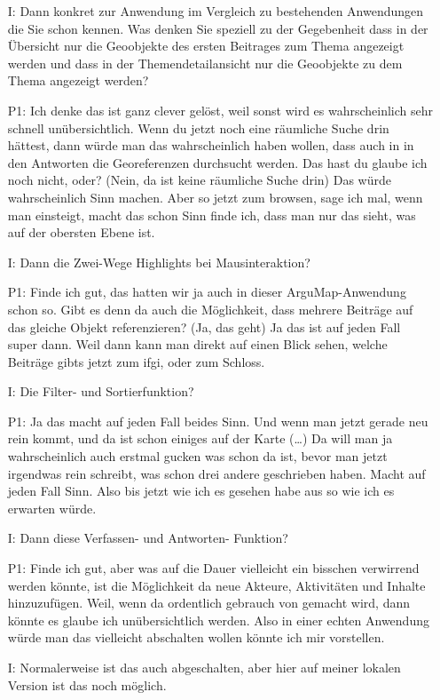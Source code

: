 \begin{itemize}
    \item[I:] Dann konkret zur Anwendung im Vergleich zu bestehenden Anwendungen die Sie schon kennen. Was denken Sie speziell zu der Gegebenheit dass in der {\"U}bersicht nur die Geoobjekte des ersten Beitrages zum Thema angezeigt werden und dass in der Themendetailansicht nur die Geoobjekte zu dem Thema angezeigt werden?
    \item[P1:] Ich denke das ist ganz clever gelöst, weil sonst wird es wahrscheinlich sehr schnell unübersichtlich. Wenn du jetzt noch eine räumliche Suche drin hättest, dann würde man das wahrscheinlich haben wollen, dass auch in in den Antworten die Georeferenzen durchsucht werden. Das hast du glaube ich noch nicht, oder? (Nein, da ist keine räumliche Suche drin) Das würde wahrscheinlich Sinn machen. Aber so jetzt zum browsen, sage ich mal, wenn man einsteigt, macht das schon Sinn finde ich, dass man nur das sieht, was auf der obersten Ebene ist.
    \item[I:] Dann die Zwei-Wege Highlights bei Mausinteraktion?
    \item[P1:] Finde ich gut, das hatten wir ja auch in dieser ArguMap-Anwendung schon so. Gibt es denn da auch die Möglichkeit, dass mehrere Beiträge auf das gleiche Objekt referenzieren? (Ja, das geht) Ja das ist auf jeden Fall super dann. Weil dann kann man direkt auf einen Blick sehen, welche Beiträge gibts jetzt zum ifgi, oder zum Schloss.
    \item[I:] Die Filter- und Sortierfunktion?
    \item[P1:] Ja das macht auf jeden Fall beides Sinn. Und wenn man jetzt gerade neu rein kommt, und da ist schon einiges auf der Karte (\dots) Da will man ja wahrscheinlich auch erstmal gucken was schon da ist, bevor man jetzt irgendwas rein schreibt, was schon drei andere geschrieben haben. Macht auf jeden Fall Sinn. Also bis jetzt wie ich es gesehen habe aus so wie ich es erwarten würde.
    \item[I:] Dann diese Verfassen- und Antworten- Funktion?
    \item[P1:] Finde ich gut, aber was auf die Dauer vielleicht ein bisschen verwirrend werden könnte, ist die Möglichkeit da neue Akteure, Aktivitäten und Inhalte hinzuzufügen. Weil, wenn da ordentlich gebrauch von gemacht wird, dann könnte es glaube ich unübersichtlich werden. Also in einer echten Anwendung würde man das vielleicht abschalten wollen könnte ich mir vorstellen.
    \item[I:] Normalerweise ist das auch abgeschalten, aber hier auf meiner lokalen Version ist das noch möglich.

\end{itemize}
